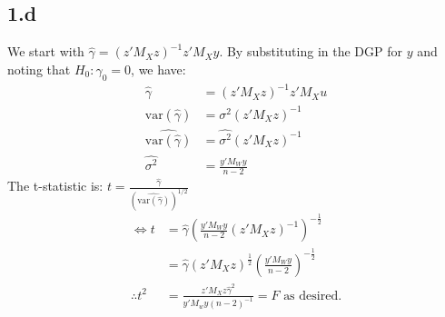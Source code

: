 \subsection{1.d}
We start with \(\hat{\gamma}=(z'M_Xz)^{-1}z'M_Xy\).  By substituting in the DGP for \(y\) and noting that \(H_0:\gamma_0=0\), we have:
\begin{align*}
    \hat{\gamma}&=(z'M_Xz)^{-1}z'M_Xu  \\
    \text{var}(\hat{\gamma}) &= \sigma^2(z'M_X z)^{-1} \\
    \widehat{\text{var}(\hat{\gamma})} &= \widehat{\sigma^2}(z'M_X z)^{-1} \\
    \widehat{\sigma^2}& = \frac{y'M_Wy}{n-2}
\end{align*}
The t-statistic is: \(t=\frac{\hat{\gamma}}{(\widehat{\text{var}(\hat{\gamma})})^{1/2}}\)
\begin{align*}
    \Leftrightarrow t &= \hat{\gamma} \left ( \frac{y'M_Wy}{n-2} (z'M_X z)^{-1} \right )^{-\frac{1}{2}} \\
    &= \hat{\gamma}(z'M_X z)^\frac{1}{2}\left ( \frac{y'M_Wy}{n-2}\right )^{-\frac{1}{2}} \\
    \therefore t^2 &=\frac{z'M_Xz\hat{\gamma}^2}{y'M_wy(n-2)^{-1}} =F \text{ as desired.}
\end{align*}



